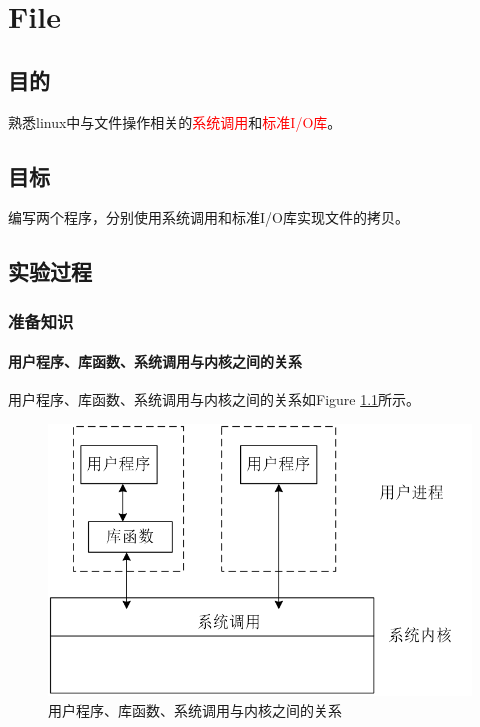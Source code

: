 \chapter{File}
\section{目的}
熟悉linux中与文件操作相关的\textcolor{red}{系统调用}和\textcolor{red}{标准I/O库}。
\section{目标}
编写两个程序，分别使用系统调用和标准I/O库实现文件的拷贝。
\section{实验过程}
\subsection{准备知识}
\subsubsection{用户程序、库函数、系统调用与内核之间的关系}
用户程序、库函数、系统调用与内核之间的关系如Figure \ref{relation}所示。
\begin{figure}
\includegraphics{601.png}
\caption{用户程序、库函数、系统调用与内核之间的关系}
\label{relation}
\end{figure}

